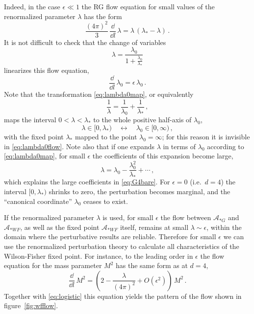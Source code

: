 Indeed, in the case $\epsilon\ll1$ the RG flow equation for small values of the
renormalized parameter $\lambda$ has the form
\begin{equation}\label{eq:logistic}
\frac{(4\pi)^2}3\,\frac{\dd}{\dd l}\,\lambda=\lambda\,(\lambda_*-\lambda)\,.
\end{equation}
It is not difficult to check that the change of variables
\begin{equation}\label{eq:lambda0map}
\lambda=\frac{\lambda_0}{1+\frac{\lambda_0}{\lambda_*}}
\end{equation}
linearizes this flow equation,
\begin{equation}\label{eq:lambda0flow}
\frac{\dd}{\dd l}\,\lambda_0=\epsilon\,\lambda_0\,.
\end{equation}
Note that the transformation \eqref{eq:lambda0map}, or equivalently
\[
\frac1\lambda=\frac1{\lambda_0}+\frac1{\lambda_*}\,,
\]
maps the interval $0<\lambda<\lambda_*$ to the whole positive half-axis of
$\lambda_0$,
\[
\lambda\in[0,\lambda_*)\quad\leftrightarrow\quad\lambda_0\in[0,\infty)\,,
\]
with the fixed point $\lambda_*$ mapped to the point $\lambda_0=\infty$; for this
reason it is invisible in \eqref{eq:lambda0flow}. Note also that if one expands
$\lambda$ in terms of $\lambda_0$ according to \eqref{eq:lambda0map}, for small
$\epsilon$ the coefficients of this expansion become large,
\[
\lambda=\lambda_0-\frac{\lambda_0^2}{\lambda_*}+\cdots\,,
\]
which explains the large coefficients in \eqref{eq:G4bare}. For $\epsilon=0$
(i.e.\ $d=4$) the interval $[0,\lambda_*)$ shrinks to zero, the perturbation
becomes marginal, and the ``canonical coordinate'' $\lambda_0$ ceases to exist.

If the renormalized parameter $\lambda$ is used, for small $\epsilon$ the flow
between $\mathcal A_{*G}$ and $\mathcal A_{*WF}$, as well as the fixed point
$\mathcal A_{*WF}$ itself, remains at small $\lambda\sim\epsilon$, within the
domain where the perturbative results are reliable. Therefore for small
$\epsilon$ we can use the renormalized perturbation theory to calculate all
characteristics of the Wilson-Fisher fixed point. For instance, to the leading
order in $\epsilon$ the flow equation for the mass parameter $M^2$ has the same
form as at $d=4$,
\begin{equation}\label{eq:M2flow21}
\frac{\dd}{\dd l}\,M^2=\left(2-\frac\lambda{(4\pi)^2}+O(\epsilon^2)\right)\,M^2\,.
\end{equation}
Together with \eqref{eq:logistic} this equation yields the pattern of the flow
shown in figure~\ref{fig:wfflow}.

